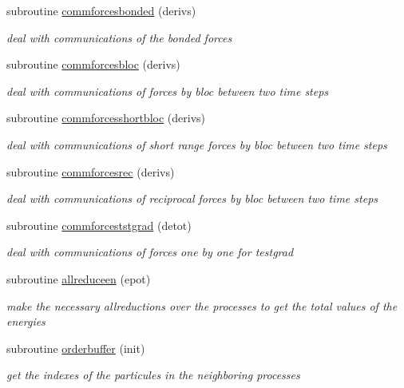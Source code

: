 \begin{DoxyCompactItemize}
subroutine \hyperlink{mpistuff_8f90_a95d69f0524ae2c5840dc50c09290401c}{commforcesbonded} (derivs)
\begin{DoxyCompactList}\small\item\em deal with communications of the bonded forces \end{DoxyCompactList}\item 
subroutine \hyperlink{mpistuff_8f90_aa40e25e26f6f34c971b1bcda983c120a}{commforcesbloc} (derivs)
\begin{DoxyCompactList}\small\item\em deal with communications of forces by bloc between two time steps \end{DoxyCompactList}\item 
subroutine \hyperlink{mpistuff_8f90_a38837bdca80b6de2820a18dac6262983}{commforcesshortbloc} (derivs)
\begin{DoxyCompactList}\small\item\em deal with communications of short range forces by bloc between two time steps \end{DoxyCompactList}\item 
subroutine \hyperlink{mpistuff_8f90_a6da09800136d5661479e302d21b7dd51}{commforcesrec} (derivs)
\begin{DoxyCompactList}\small\item\em deal with communications of reciprocal forces by bloc between two time steps \end{DoxyCompactList}\item 
subroutine \hyperlink{mpistuff_8f90_a825a356f92615025c875756153db8b1f}{commforceststgrad} (detot)
\begin{DoxyCompactList}\small\item\em deal with communications of forces one by one for testgrad \end{DoxyCompactList}\item 
subroutine \hyperlink{mpistuff_8f90_a9617d597ce2426a85504db38fdccaf2c}{allreduceen} (epot)
\begin{DoxyCompactList}\small\item\em make the necessary allreductions over the processes to get the total values of the energies \end{DoxyCompactList}\item 
subroutine \hyperlink{mpistuff_8f90_a9a604af594c58f25234f3ae8c4b47844}{orderbuffer} (init)
\begin{DoxyCompactList}\small\item\em get the indexes of the particules in the neighboring processes \end{DoxyCompactList}\item 

\end{DoxyCompactItemize}
